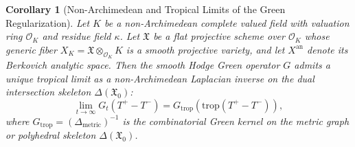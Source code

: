 \documentclass[11pt,a4paper]{article}
\theoremstyle{definition}
\theoremstyle{plain}
\newtheorem{corollary}[definition]{Corollary}
\begin{document}
\begin{corollary}[Non-Archimedean and Tropical Limits of the Green Regularization]
\label{cor:tropical_non_archimedean_limit}
Let $K$ be a non-Archimedean complete valued field with valuation ring $\mathcal{O}_K$ and residue field $\kappa$. Let $\mathfrak{X}$ be a flat projective scheme over $\mathcal{O}_K$ whose generic fiber $X_K = \mathfrak{X} \otimes_{\mathcal{O}_K} K$ is a smooth projective variety, and let $X^{\mathrm{an}}$ denote its Berkovich analytic space. Then the smooth Hodge Green operator $G$ admits a unique tropical limit as a non-Archimedean Laplacian inverse on the dual intersection skeleton $\Delta(\mathfrak{X}_0)$:
\begin{equation}
    \label{eq:tropical_green_limit}
    \lim_{t \to \infty} G_t(T^+ - T^-) = G_{\mathrm{trop}}(\mathrm{trop}(T^+ - T^-)),
\end{equation}
where $G_{\mathrm{trop}} = (\Delta_{\mathrm{metric}})^{-1}$ is the combinatorial Green kernel on the metric graph or polyhedral skeleton $\Delta(\mathfrak{X}_0)$.
\end{corollary}
\end{document}
